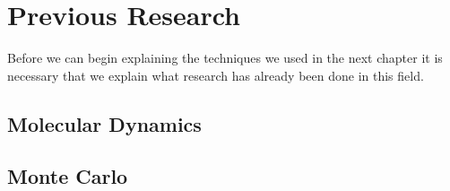 \chapter{Previous Research}

Before we can begin explaining the techniques we used in the next chapter it is necessary that we explain what research has already been done in this field.

\section{Molecular Dynamics}

\section{Monte Carlo}